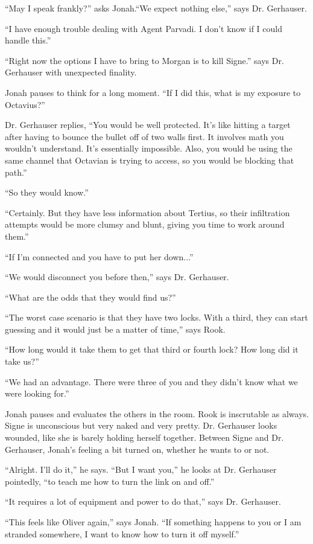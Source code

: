 ``May I speak frankly?'' asks Jonah.``We expect nothing else,'' says Dr. Gerhauser.

``I have enough trouble dealing with Agent Parvadi.  I don't know if I could handle this.''

``Right now the options I have to bring to Morgan is to kill Signe.'' says Dr. Gerhauser with unexpected finality.

Jonah pauses to think for a long moment.  ``If I did this, what is my exposure to Octavius?''

Dr. Gerhauser replies, ``You would be well protected.  It's like hitting a target after having to bounce the bullet off of two walls first.  It involves math you wouldn't understand.  It's essentially impossible.  Also, you would be using the same channel that Octavian is trying to access, so you would be blocking that path.''

``So they would know.''

``Certainly.  But they have less information about Tertius, so their infiltration attempts would be more clumsy and blunt, giving you time to work around them.''

``If I'm connected and you have to put her down...''

``We would disconnect you before then,'' says Dr. Gerhauser.

``What are the odds that they would find us?''

``The worst case scenario is that they have two locks.  With a third, they can start guessing and it would just be a matter of time,'' says Rook.

``How long would it take them to get that third or fourth lock?   How long did it take us?''

``We had an advantage.  There were three of you and they didn't know what we were looking for.''

Jonah pauses and evaluates the others in the room.  Rook is inscrutable as always.  Signe is unconscious but very naked and very pretty.  Dr. Gerhauser looks wounded, like she is barely holding herself together.  Between Signe and Dr. Gerhauser, Jonah's feeling a bit turned on, whether he wants to or not.

``Alright.  I'll do it,'' he says. ``But I want you,'' he looks at Dr. Gerhauser pointedly, ``to teach me how to turn the link on and off.''

``It requires a lot of equipment and power to do that,'' says Dr. Gerhauser.

``This feels like Oliver again,'' says Jonah.  ``If something happens to you or I am stranded somewhere, I want to know how to turn it off myself.''

